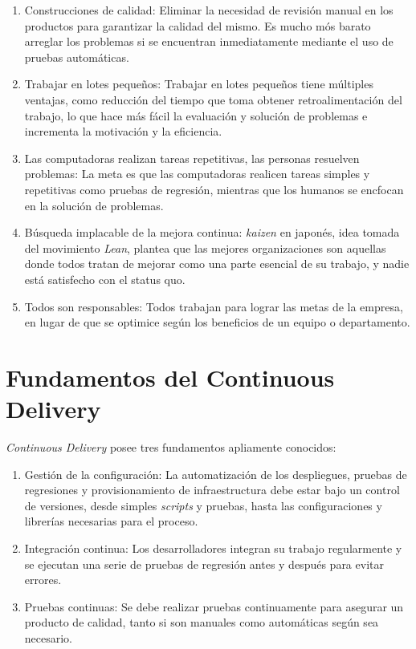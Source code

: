 \begin{enumerate}
    \item Construcciones de calidad: Eliminar la necesidad de revisión manual en los productos para garantizar la calidad del mismo. Es mucho mós barato arreglar los problemas si se encuentran inmediatamente mediante el uso de pruebas automáticas.

    \item Trabajar en lotes pequeños: Trabajar en lotes pequeños tiene múltiples ventajas, como reducción del tiempo que toma obtener retroalimentación del trabajo, lo que hace más fácil la evaluación y solución de problemas e incrementa la motivación y la eficiencia.

    \item Las computadoras realizan tareas repetitivas, las personas resuelven problemas: La meta es que las computadoras realicen tareas simples y repetitivas como pruebas de regresión, mientras que los humanos se encfocan en la solución de problemas.

    \item Búsqueda implacable de la mejora continua: \textit{kaizen} en japonés, idea tomada del movimiento \textit{Lean}, plantea que las mejores organizaciones son aquellas donde todos tratan de mejorar como una parte esencial de su trabajo, y nadie está satisfecho con el status quo.

    \item Todos son responsables: Todos trabajan para lograr las metas de la empresa, en lugar de que se optimice según los beneficios de un equipo o departamento.

\end{enumerate}

\section{Fundamentos del Continuous Delivery}

\textit{Continuous Delivery} posee tres fundamentos apliamente conocidos:

\begin{enumerate}

    \item Gestión de la configuración: La automatización de los despliegues, pruebas de regresiones y provisionamiento de infraestructura debe estar bajo un control de versiones, desde simples \textit{scripts} y pruebas, hasta las configuraciones y librerías necesarias para el proceso.

    \item Integración continua: Los desarrolladores integran su trabajo regularmente y se ejecutan una serie de pruebas de regresión antes y después para evitar errores.

    \item Pruebas continuas: Se debe realizar pruebas continuamente para asegurar un producto de calidad, tanto si son manuales como automáticas según sea necesario.

\end{enumerate}

